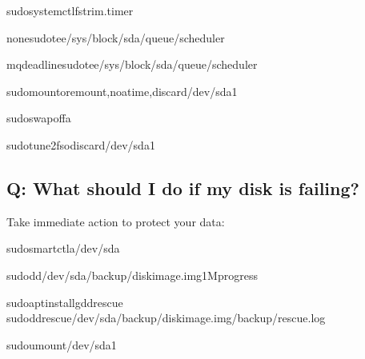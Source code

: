 \documentclass[letterpaper,10pt,english]{sphinxmanual}
\begin{document}
\begin{sphinxVerbatim}[commandchars=\\\{\}]
sudosystemctlfstrim.timer

nonesudotee/sys/block/sda/queue/scheduler

mq\PYGZhy{}deadlinesudotee/sys/block/sda/queue/scheduler

sudomount\PYGZhy{}oremount,noatime,discard/dev/sda1

sudoswapoff\PYGZhy{}a

sudotune2fs\PYGZhy{}odiscard/dev/sda1
\end{sphinxVerbatim}


\subsection{Q: What should I do if my disk is failing?}
\label{\detokenize{faq:q-what-should-i-do-if-my-disk-is-failing}}
\sphinxAtStartPar
{} Take immediate action to protect your data:

\begin{sphinxVerbatim}[commandchars=\\\{\}]
sudosmartctl\PYGZhy{}a/dev/sda

sudodd/dev/sda/backup/disk\PYGZus{}image.img1Mprogress

sudoaptinstallgddrescue
sudoddrescue/dev/sda/backup/disk\PYGZus{}image.img/backup/rescue.log

sudoumount/dev/sda1

\end{sphinxVerbatim}
\end{document}
